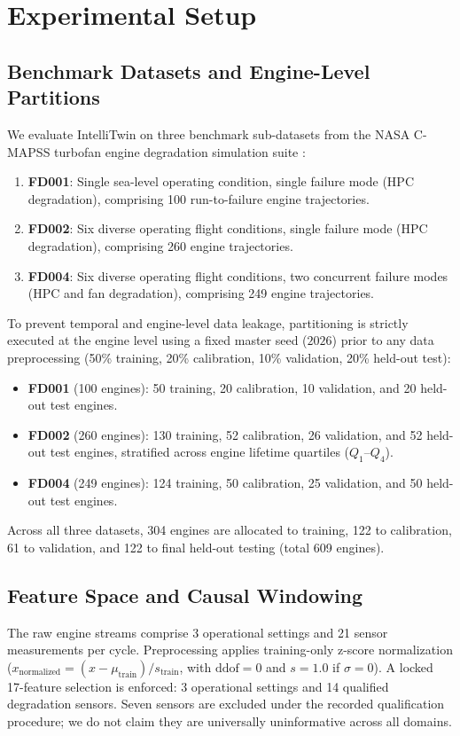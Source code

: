 \section{Experimental Setup}
\label{sec:experimental_setup}

\subsection{Benchmark Datasets and Engine-Level Partitions}
\label{subsec:datasets_splits}
We evaluate IntelliTwin on three benchmark sub-datasets from the NASA C-MAPSS turbofan engine degradation simulation suite \cite{saxena2008damage}:
\begin{enumerate}
    \item \textbf{FD001}: Single sea-level operating condition, single failure mode (HPC degradation), comprising 100 run-to-failure engine trajectories.
    \item \textbf{FD002}: Six diverse operating flight conditions, single failure mode (HPC degradation), comprising 260 engine trajectories.
    \item \textbf{FD004}: Six diverse operating flight conditions, two concurrent failure modes (HPC and fan degradation), comprising 249 engine trajectories.
\end{enumerate}

To prevent temporal and engine-level data leakage, partitioning is strictly executed at the engine level using a fixed master seed ($2026$) prior to any data preprocessing (50\% training, 20\% calibration, 10\% validation, 20\% held-out test):
\begin{itemize}
    \item \textbf{FD001} (100 engines): 50 training, 20 calibration, 10 validation, and 20 held-out test engines.
    \item \textbf{FD002} (260 engines): 130 training, 52 calibration, 26 validation, and 52 held-out test engines, stratified across engine lifetime quartiles ($Q_1$--$Q_4$).
    \item \textbf{FD004} (249 engines): 124 training, 50 calibration, 25 validation, and 50 held-out test engines.
\end{itemize}
Across all three datasets, 304 engines are allocated to training, 122 to calibration, 61 to validation, and 122 to final held-out testing (total 609 engines).

\subsection{Feature Space and Causal Windowing}
The raw engine streams comprise 3 operational settings and 21 sensor measurements per cycle. Preprocessing applies training-only z-score normalization ($x_{\text{normalized}} = (x - \mu_{\text{train}})/s_{\text{train}}$, with $\text{ddof}=0$ and $s=1.0$ if $\sigma=0$). A locked 17-feature selection is enforced: 3 operational settings and 14 qualified degradation sensors. Seven sensors are excluded under the recorded qualification procedure; we do not claim they are universally uninformative across all domains.

